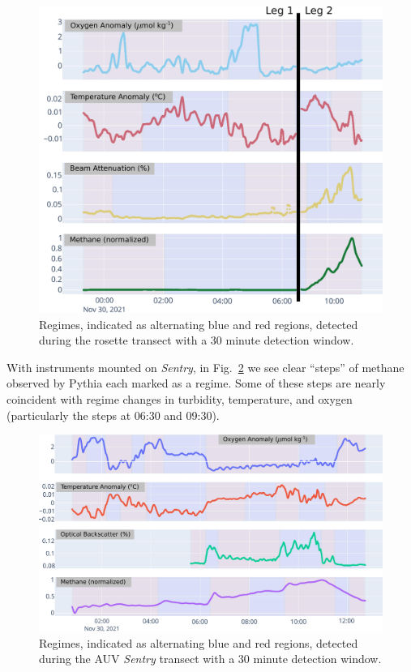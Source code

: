 \begin{figure}[h!]
    \centering
    \includegraphics[width=1\columnwidth]{figures/chap3_rosette_regimes.jpg}
    \caption[Regime changes in rosette observations]{Regimes, indicated as alternating blue and red regions, detected during the rosette transect with a 30 minute detection window.}
    \label{fig:rosette_regimes}
\end{figure}


With instruments mounted on \emph{Sentry}, in Fig.~\ref{fig:sentry_regimes} we see clear ``steps'' of methane observed by Pythia each marked as a regime. Some of these steps are nearly coincident with regime changes in turbidity, temperature, and oxygen (particularly the steps at 06:30 and 09:30).  

\begin{figure}[h!]
    \centering
    \includegraphics[width=1\columnwidth]{figures/chap3_sentry_regimes.jpg}
    \caption[Regime changes in AUV \Sentry observations]{Regimes, indicated as alternating blue and red regions, detected during the AUV \emph{Sentry} transect with a 30 minute detection window.}
    \label{fig:sentry_regimes}
\end{figure}


